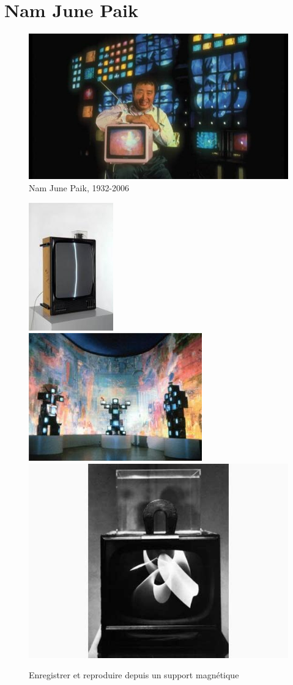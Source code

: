 \documentclass[
  french,
]{book}
\begin{document}
\hypertarget{nam-june-paik}{%
\section{Nam June Paik}\label{nam-june-paik}}

\begin{figure}
\centering
\includegraphics{medias/corpus/paik/paik_10.jpg}
\caption{Nam June Paik, 1932-2006}
\end{figure}

\begin{figure}

{\centering \includegraphics[width=0.32\linewidth]{medias/corpus/paik/____NamJunepaik_0220452w_namjunepaikzenfortv1961975_vignette_300_209_20150414152312_20150414153250} \includegraphics[width=0.32\linewidth]{medias/corpus/paik/__NamJunepaik_22222_vignette_300_209_20150414121039_20150414121316} \includegraphics[width=0.32\linewidth]{medias/corpus/paik/_NamJunepaik_paik_magnet_tv_20150506194428_20150506194457} 

}

\caption{Enregistrer et reproduire depuis un support magnétique}\label{fig:unnamed-chunk-3}
\end{figure}
\end{document}
